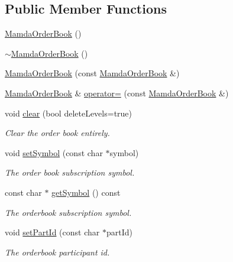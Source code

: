 \subsection*{Public Member Functions}
\begin{CompactItemize}
\item 
\hyperlink{classWombat_1_1MamdaOrderBook_f4f51e3c305a568ce36a070b99c95ef3}{Mamda\-Order\-Book} ()
\item 
\hyperlink{classWombat_1_1MamdaOrderBook_66f03ee08a5eb88f478abd4b03208d2e}{$\sim$Mamda\-Order\-Book} ()
\item 
\hyperlink{classWombat_1_1MamdaOrderBook_90af371ee3290354fe13e5367b752bba}{Mamda\-Order\-Book} (const \hyperlink{classWombat_1_1MamdaOrderBook}{Mamda\-Order\-Book} \&)
\item 
\hyperlink{classWombat_1_1MamdaOrderBook}{Mamda\-Order\-Book} \& \hyperlink{classWombat_1_1MamdaOrderBook_846c46ab40d3365678d59c2fa9273f77}{operator=} (const \hyperlink{classWombat_1_1MamdaOrderBook}{Mamda\-Order\-Book} \&)
\item 
void \hyperlink{classWombat_1_1MamdaOrderBook_82295dc2807e8518049d57078acae9b0}{clear} (bool delete\-Levels=true)
\begin{CompactList}\small\item\em Clear the order book entirely. \item\end{CompactList}\item 
void \hyperlink{classWombat_1_1MamdaOrderBook_c8c0dc6087ad04b5baf3997a0fd6f2be}{set\-Symbol} (const char $\ast$symbol)
\begin{CompactList}\small\item\em The order book subscription symbol. \item\end{CompactList}\item 
const char $\ast$ \hyperlink{classWombat_1_1MamdaOrderBook_7dcfefc45b555a316b294afcfd8d4046}{get\-Symbol} () const 
\begin{CompactList}\small\item\em The orderbook subscription symbol. \item\end{CompactList}\item 
void \hyperlink{classWombat_1_1MamdaOrderBook_4d600903da00215a31ee15fd5e3f462f}{set\-Part\-Id} (const char $\ast$part\-Id)
\begin{CompactList}\small\item\em The orderbook participant id. \item\end{CompactList}\item 

\end{CompactItemize}
